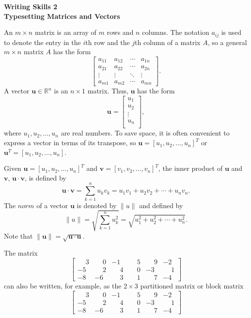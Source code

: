 \documentclass[12pt]{article}
\begin{document}
\begin{center}
    \textbf{Writing Skills 2\\
        Typesetting Matrices and Vectors}
\end{center}

An $m \times n$ matrix is an array of $m$ rows and $n$ columns. The notation $a_{ij}$
is used to denote the entry in the $i$th row and the $j$th column of a matrix $A$, so a general $m \times n$ matrix $A$ has the form
$$ \begin{bmatrix}
        a_{11} & a_{12} & \cdots & a_{1n} \\
        a_{21} & a_{22} & \cdots & a_{2n} \\
        \vdots & \vdots & \ddots & \vdots \\
        a_{m1} & a_{m2} & \cdots & a_{mn}
    \end{bmatrix}    .$$
A vector $ \mathbf{u} \in \mathbb{R}^n$ is an $n \times 1$ matrix. Thus, $\mathbf{u}$ has the form $$ \mathbf{u} = \begin{bmatrix}
        u_1 \\u_2\\\vdots\\u_n\\
    \end{bmatrix},$$
where $u_1,u_2, \ldots , u_n$ are real numbers. To save space, it is often convenient to express a vector in terms of its transpose, so $\mathbf{u} = [u_1,u_2,\ldots,u_n]^T$ or $ \mathbf{u}^T = [u_1,u_2,\ldots,u_n]$.

Given $\mathbf{u} = [u_1,u_2,\ldots,u_n]^T$ and $\mathbf{v} = [v_1,v_2,\ldots,v_n]^T$, the inner product of $\mathbf{u}$ and $\mathbf{v}$, $\mathbf{u} \cdot \mathbf{v}$, is defined by
\[ \mathbf{u} \cdot \mathbf{v} = \sum_{k=1}^{n} u_k v_k = u_1v_1 + u_2v_2 + \cdots + u_n v_n .\]
The $norm$ of  a vector $\mathbf{u}$ is denoted by $\|u\|$ and defined by \[ \|u\| = \sqrt{ \sum_{k=1}^{n} u_k^2} = \sqrt{u_1^2+u_2^2+\cdots + u_n^2} .\]
Note that $\|\mathbf{u}\| = \sqrt{\mathbf{u} \cdot \mathbf{u}}.$

The matrix $$ \begin{bmatrix}
        \phantom{-}3 & \phantom{-}0 & -1           & \phantom{-}5 & \phantom{-}9 & -2           \\
        -5           & \phantom{-}2 & \phantom{-}4 & \phantom{-}0 & -3           & \phantom{-}1 \\
        -8           & -6           & \phantom{-}3 & \phantom{-}1 & \phantom{-}7 & -4
    \end{bmatrix}$$
can also be written, for example, as the $2 \times 3$ partitioned matrix or block matrix
$$ \left[
        \begin{array}{ccc|cc|c}
            \phantom{-}3& \phantom{-}0& -1 &\phantom{-}5 &\phantom{-}9 &-2 \\
            -5& \phantom{-}2& \phantom{-}4& \phantom{-}0 &-3 &\phantom{-}1\\
            \hline
            -8& -6& \phantom{-}3& \phantom{-}1 &\phantom{-}7 &-4
        \end{array}
        \right]
$$
\end{document}
